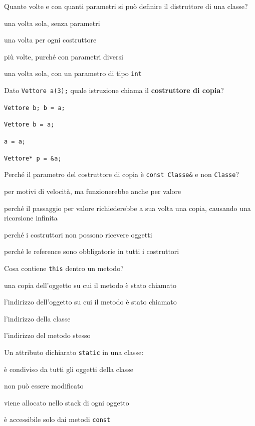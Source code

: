 \begin{quiz}{Quante volte e con quanti parametri si può definire il distruttore di una classe?}
  \item una volta sola, senza parametri
  \item una volta per ogni costruttore
  \item più volte, purché con parametri diversi
  \item una volta sola, con un parametro di tipo \texttt{int}
\end{quiz}

\begin{quiz}{Dato \texttt{Vettore a(3);} quale istruzione chiama il \textbf{costruttore di copia}?}
  \item \texttt{Vettore b; b = a;}
  \item \texttt{Vettore b = a;}
  \item \texttt{a = a;}
  \item \texttt{Vettore* p = \&a;}
\end{quiz}

\begin{quiz}{Perché il parametro del costruttore di copia è \texttt{const Classe\&} e non \texttt{Classe}?}
  \item per motivi di velocità, ma funzionerebbe anche per valore
  \item perché il passaggio per valore richiederebbe a sua volta una copia, causando una ricorsione infinita
  \item perché i costruttori non possono ricevere oggetti
  \item perché le reference sono obbligatorie in tutti i costruttori
\end{quiz}

\begin{quiz}{Cosa contiene \texttt{this} dentro un metodo?}
  \item una copia dell'oggetto su cui il metodo è stato chiamato
  \item l'indirizzo dell'oggetto su cui il metodo è stato chiamato
  \item l'indirizzo della classe
  \item l'indirizzo del metodo stesso
\end{quiz}

\begin{quiz}{Un attributo dichiarato \texttt{static} in una classe:}
  \item è condiviso da tutti gli oggetti della classe
  \item non può essere modificato
  \item viene allocato nello stack di ogni oggetto
  \item è accessibile solo dai metodi \texttt{const}
\end{quiz}

